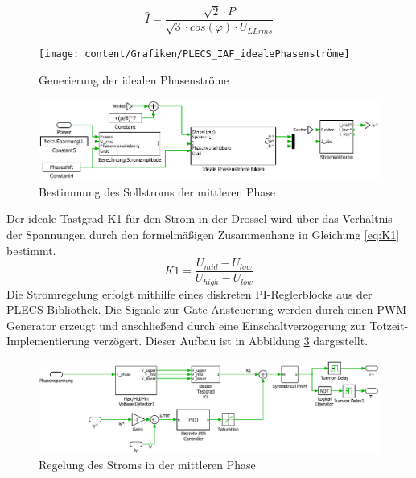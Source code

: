 			\begin{equation}
				\label{eq:IdachTheory}
				\hat{I} = \dfrac{\sqrt{2} \cdot P   }{ \sqrt{3} \cdot cos(\varphi) \cdot  U_{LLrms} } 
			\end{equation}
		\begin{figure}[H]
			\centering
			\texttt{[image: content/Grafiken/PLECS\_IAF\_idealePhasenströme]}
			\caption{Generierung der idealen Phasenströme}
			\label{fig:plecsiafidealephasenstrome}
		\end{figure}
		
		
		\begin{figure}[H]
			\centering
			\includegraphics[width=1\linewidth]{content/Grafiken/PlecsIAFiy}
			\caption{Bestimmung des Sollstroms der mittleren Phase}
			\label{fig:plecsiafiy}
		\end{figure}
		
	Der ideale Tastgrad K1 für den Strom in der Drossel wird über das Verhältnis der Spannungen durch den formelmäßigen Zusammenhang in Gleichung \ref{eq:K1} bestimmt. 
	\begin{equation}
		\label{eq:K1}
		K1 = \dfrac{U_{mid}- U_{low}}{U_{high} -U_{low}} 
	\end{equation}
Die Stromregelung erfolgt mithilfe eines diskreten PI-Reglerblocks aus der PLECS-Bibliothek. Die Signale zur Gate-Ansteuerung werden durch einen PWM-Generator erzeugt und anschließend durch eine Einschaltverzögerung zur Totzeit-Implementierung verzögert. Dieser Aufbau ist in Abbildung \ref{fig:plecsiafivsk1} dargestellt. 
		\begin{figure}
			\centering
			\includegraphics[width=1\linewidth]{content/Grafiken/PlecsIAFivsK1}
			\caption{Regelung des Stroms in der mittleren Phase}
			\label{fig:plecsiafivsk1}
		\end{figure}
		
